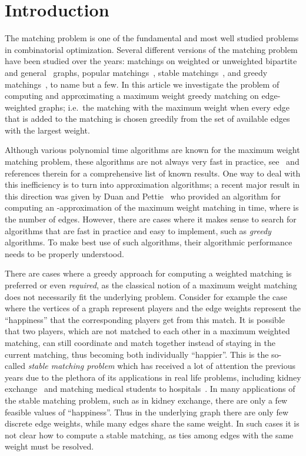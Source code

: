 \documentclass[a4paper,11pt]{article}
\begin{document}
\section{Introduction}
The matching problem is one of the fundamental and most well studied problems in 
combinatorial optimization. Several different versions of the matching problem 
have been studied over the years: matchings on weighted or unweighted 
bipartite~\cite{FL10} and general~\cite{Edmonds} graphs, popular 
matchings~\cite{AIKM}, stable matchings~\cite{R84}, and greedy 
matchings~\cite{HK78}, to name but a few. 
In this article we investigate the problem of computing and approximating a 
maximum weight greedy matching on edge-weighted graphs; i.e.~the matching with 
the maximum weight when every edge that is added to the matching is chosen 
greedily from the set of available edges with the largest weight.


Although various polynomial time algorithms are known for the maximum weight 
matching problem, these algorithms are not always very fast in practice, 
see~\cite{Duan14, San09} and references therein for a comprehensive list of 
known results. 
One way to deal with this inefficiency is to turn into approximation algorithms;
a recent major result in this direction was given by Duan and Pettie~\cite{Duan14} 
who provided an algorithm for computing an -approximation of the maximum 
weight matching in  time, where  is the number 
of edges. 
However, there are cases where it makes sense to search for algorithms that are 
fast in practice and easy to implement, such as \emph{greedy} algorithms. To make best 
use of such algorithms, their algorithmic performance needs to be properly understood. 



There are cases where a greedy approach for computing a weighted matching is 
preferred or even \emph{required}, as the classical notion of a maximum weight 
matching does not necessarily fit the underlying problem. 
Consider for example the case where the vertices of a graph represent players 
and the edge weights represent the ``happiness'' that the corresponding 
players get from this match. 
It is possible that two players, which are not matched to each other in a 
maximum weighted matching, can still coordinate and match together instead of 
staying in the current matching, thus becoming both individually ``happier''. 
This is the so-called \emph{stable matching problem} which has received a 
lot of attention the previous years due to the plethora of its applications 
in real life problems, including kidney exchange~\cite{R04} and matching medical 
students to hospitals~\cite{RP99}. 
In many applications of the stable matching problem, such as in kidney exchange, 
there are only a few feasible values of ``happiness''. Thus in the underlying 
graph there are only few discrete edge weights, while many edges share the same 
weight. 
In such cases it is not clear how to compute a stable matching, as ties among 
edges with the same weight must be resolved.
\end{document}
